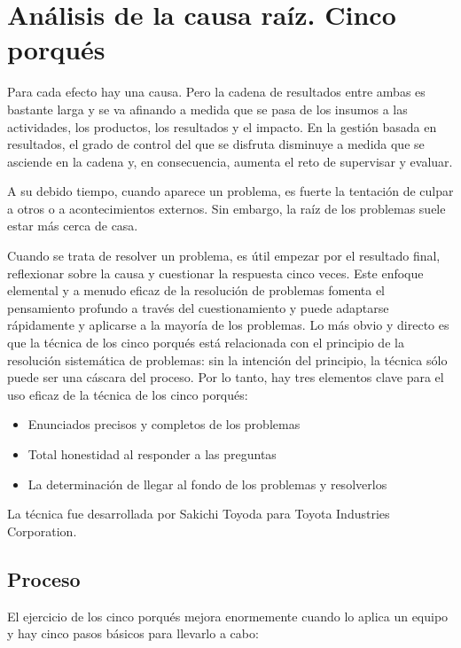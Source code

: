 \section{Análisis de la causa raíz. Cinco porqués}

Para cada efecto hay una causa.
Pero la cadena de resultados entre ambas es bastante larga y se va afinando a medida que se pasa de los insumos a las actividades, los productos, los resultados y el impacto.
En la gestión basada en resultados, el grado de control del que se disfruta disminuye a medida que se asciende en la cadena y, en consecuencia, aumenta el reto de supervisar y evaluar.

A su debido tiempo, cuando aparece un problema, es fuerte la tentación de culpar a otros o a acontecimientos externos.
Sin embargo, la raíz de los problemas suele estar más cerca de casa.

Cuando se trata de resolver un problema, es útil empezar por el resultado final, reflexionar sobre la causa y cuestionar la respuesta cinco veces.
Este enfoque elemental y a menudo eficaz de la resolución de problemas fomenta el pensamiento profundo a través del cuestionamiento y puede adaptarse rápidamente y aplicarse a la mayoría de los problemas.
Lo más obvio y directo es que la técnica de los cinco porqués está relacionada con el principio de la resolución sistemática de problemas: sin la intención del principio, la técnica sólo puede ser una cáscara del proceso.
Por lo tanto, hay tres elementos clave para el uso eficaz de la técnica de los cinco porqués:

\begin{itemize}
    \item Enunciados precisos y completos de los problemas
    \item Total honestidad al responder a las preguntas
    \item La determinación de llegar al fondo de los problemas y resolverlos
\end{itemize}

La técnica fue desarrollada por Sakichi Toyoda para Toyota Industries Corporation.

\subsection{Proceso}

El ejercicio de los cinco porqués mejora enormemente cuando lo aplica un equipo y hay cinco pasos básicos para llevarlo a cabo:

